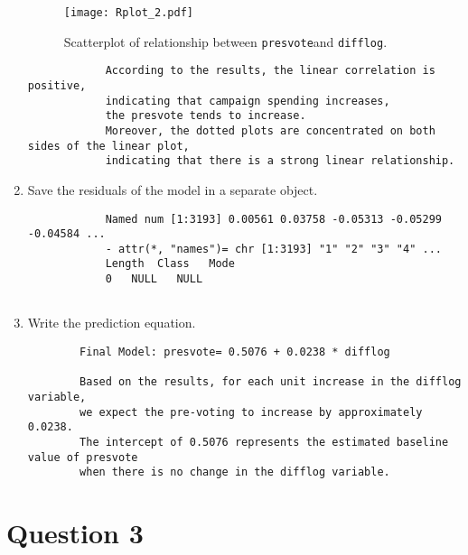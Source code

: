 \documentclass[12pt,letterpaper]{article}
\begin{document}
\begin{enumerate}
\begin{figure}[h!]
			\caption{\footnotesize Scatterplot of relationship between \texttt{presvote}and \texttt{difflog}.}
			\label{fig:Rplot_2}
			\texttt{[image: Rplot\_2.pdf]}
		\end{figure}
		\begin{footnotesize}
			\begin{verbatim} 
			According to the results, the linear correlation is positive, 
			indicating that campaign spending increases, 
			the presvote tends to increase.
			Moreover, the dotted plots are concentrated on both sides of the linear plot, 
			indicating that there is a strong linear relationship.
		\end{verbatim}
	\end{footnotesize}
		
		\item Save the residuals of the model in a separate object.	
		\vspace{.15cm}
		 
	 \begin{footnotesize}
		 \begin{verbatim} 
		 	Named num [1:3193] 0.00561 0.03758 -0.05313 -0.05299 -0.04584 ...
		 	- attr(*, "names")= chr [1:3193] "1" "2" "3" "4" ...
		 	Length  Class   Mode 
		 	0   NULL   NULL
	          
     	 \end{verbatim}
      \end{footnotesize}
		\item Write the prediction equation.
		
		\vspace{.15cm}
		 
		\vspace{.15cm}
		\begin{footnotesize}
			\begin{verbatim}  
		Final Model: presvote= 0.5076 + 0.0238 * difflog
	    
		Based on the results, for each unit increase in the difflog variable,
		we expect the pre-voting to increase by approximately 0.0238.
		The intercept of 0.5076 represents the estimated baseline value of presvote 
		when there is no change in the difflog variable.
        	\end{verbatim}
        \end{footnotesize}
	\end{enumerate}
	
\vspace{.5cm}
\section*{Question 3}
\end{document}
